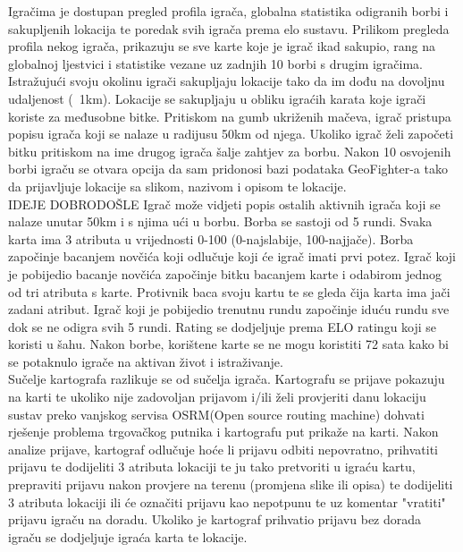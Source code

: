 	
		\textnormal{Igračima je dostupan pregled profila igrača, globalna statistika odigranih borbi i sakupljenih lokacija te poredak svih igrača prema elo sustavu. Prilikom pregleda profila nekog igrača, prikazuju se sve karte koje je igrač ikad sakupio, rang na globalnoj ljestvici i statistike vezane uz zadnjih 10 borbi s drugim igračima. Istražujući svoju okolinu igrači sakupljaju lokacije tako da im dođu na dovoljnu udaljenost (~1km). Lokacije se sakupljaju u obliku igraćih karata koje igrači koriste za međusobne bitke. Pritiskom na gumb ukriženih mačeva, igrač pristupa popisu igrača koji se nalaze u radijusu 50km od njega. Ukoliko igrač želi započeti bitku pritiskom na ime drugog igrača šalje zahtjev za borbu. Nakon 10 osvojenih borbi igraču se otvara opcija da sam pridonosi bazi podataka GeoFighter-a tako da prijavljuje lokacije sa slikom, nazivom i opisom te lokacije.}\\
	
		\textnormal{IDEJE DOBRODOŠLE Igrač može vidjeti popis ostalih aktivnih igrača koji se nalaze unutar 50km i s njima ući u borbu. Borba se sastoji od 5 rundi. Svaka karta ima 3 atributa u vrijednosti 0-100 (0-najslabije, 100-najjače). Borba započinje bacanjem novčića koji odlučuje koji će igrač imati prvi potez. Igrač koji je pobijedio bacanje novčića započinje bitku bacanjem karte i odabirom jednog od tri atributa s karte. Protivnik baca svoju kartu te se gleda čija karta ima jači zadani atribut. Igrač koji je pobijedio trenutnu rundu započinje iduću rundu sve dok se ne odigra svih 5 rundi. Rating se dodjeljuje prema ELO ratingu koji se koristi u šahu.}
		\textnormal{Nakon borbe, korištene karte se ne mogu koristiti 72 sata kako bi se potaknulo igrače na aktivan život i istraživanje.}\\
		
		\textnormal{Sučelje kartografa razlikuje se od sučelja igrača. Kartografu se prijave pokazuju na karti te ukoliko nije zadovoljan prijavom i/ili želi provjeriti danu lokaciju sustav preko vanjskog servisa OSRM(Open source routing machine) dohvati rješenje problema trgovačkog putnika i kartografu put prikaže na karti. Nakon analize prijave, kartograf odlučuje hoće li prijavu odbiti nepovratno, prihvatiti prijavu te dodijeliti 3 atributa lokaciji te ju tako pretvoriti u igraću kartu, prepraviti prijavu nakon provjere na terenu (promjena slike ili opisa) te dodijeliti 3 atributa lokaciji ili će označiti prijavu kao nepotpunu te uz komentar "vratiti" prijavu igraču na doradu. Ukoliko je kartograf prihvatio prijavu bez dorada igraču se dodjeljuje igraća karta te lokacije.}\\
		
